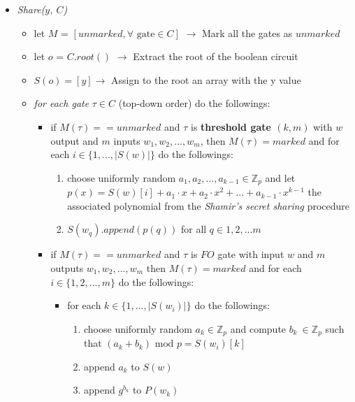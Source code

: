 \documentclass[12pt]{article}
\begin{document}
\begin{enumerate}
		\begin{itemize}
			\item \textit{Share($y$, $C$)}
			\begin{itemize}
				\item let $M$ = $[unmarked, \forall \textrm{ gate} \in C]$ $\rightarrow$ Mark all the gates as $unmarked$
				\item let $o$ = $C.root()$ $\rightarrow$ Extract the root of the boolean circuit
				\item $S(o) = [y] \rightarrow$ Assign to the root an array with the y value   
				\item \textit{for each gate} $\tau \in C$ (top-down order) do the followings:
				\begin{itemize}
				    \item if $M(\tau) == unmarked$ and $\tau$ is \textbf{threshold gate $(k, m)$} with $w$ output and $m$ inputs $w_1, w_2, ..., w_m$, then $M(\tau) = marked$ and for each $i \in \{1, ...,|S(w)|\}$ do the followings:
				        \begin{enumerate}
				            \item choose uniformly random $a_1, a_2, ..., a_{k - 1} \in \mathbb{Z}_p$ and let $p(x) = S(w)[i] + a_1 \cdot x + a_2 \cdot x^2 + ... + a_{k-1} \cdot x^{k - 1}$ the associated polynomial from the \textit{Shamir's secret sharing} procedure
				            \item $S(w_q).append(p(q))$ for all $q \in {1, 2, ...m}$  
				        \end{enumerate}
				    \item if $M(\tau) == unmarked$ and $\tau$ is $FO$ gate with input $w$ and $m$ outputs $w_1, w_2, ..., w_m$ then $M(\tau) = marked$ and for each $i \in \{1, 2, ..., m\}$ do the followings:
				    \begin{itemize}
				        \item for each $k \in \{1, ..., |S(w_i)|\}$ do the followings:
				        \begin{enumerate}
				            \item choose uniformly random $a_k \in \mathbb{Z}_p$ and compute $b_k \ \in \mathbb{Z}_p$ such that $(a_k + b_k) \textrm{ mod } p = S(w_i)[k]$
				            \item append $a_k$ to $S(w)$
				            \item append $g^{b_k}$ to $P(w_k)$
				        \end{enumerate}
				    \end{itemize}
				    

\end{itemize}
\end{itemize}
\end{itemize}
\end{enumerate}
\end{document}
